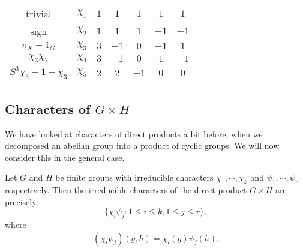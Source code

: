 \documentclass[a4paper]{article}
\begin{document}
\begin{eg}
\begin{center}
\begin{tabular}{ccccccc}
      \midrule
      trivial & $\chi_1$ & $1$ & $1$ & $1$ & $1$ & $1$\\
      sign & $\chi_2$ & $1$ & $1$ & $1$ & $-1$ & $-1$\\
      $\pi_X - 1_G$ & $\chi_3$ & $3$ & $-1$ & $0$ & $-1$ & $1$\\
      $\chi_3 \chi_2$ & $\chi_4$ & $3$ & $-1$ & $0$ & $1$ & $-1$\\
      $S^3 \chi_3 - 1 - \chi_3$ & $\chi_5$ & $2$ & $2$ & $-1$ & $0$ & $0$\\
      \bottomrule
    \end{tabular}
  \end{center}
\end{eg}

\subsection{Characters of \texorpdfstring{$G\times H$}{G x H}}
We have looked at characters of direct products a bit before, when we decomposed an abelian group into a product of cyclic groups. We will now consider this in the general case.

\begin{prop}
  Let $G$ and $H$ be finite groups with irreducible characters $\chi_1, \cdots, \chi_k$ and $\psi_1, \cdots, \psi_r$ respectively. Then the irreducible characters of the direct product $G\times H$ are precisely
  \[
    \{\chi_i \psi_j: 1 \leq i \leq k, 1 \leq j \leq r\},
  \]
  where
  \[
    (\chi_i \psi_j)(g, h) = \chi_i(g) \psi_j(h).
  \]
\end{prop}
\end{document}
